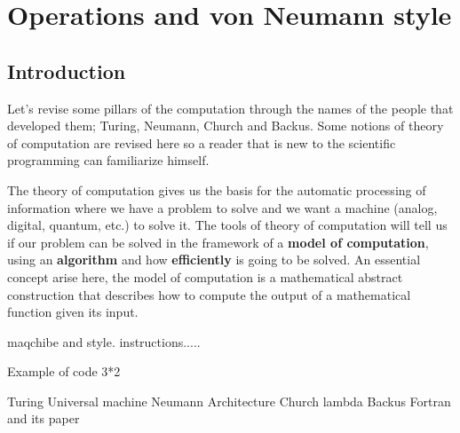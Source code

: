 \chapter{Operations and von Neumann style} 

\section{Introduction}

Let's revise some pillars of the computation through the names of the people that developed them; Turing, Neumann, Church and Backus. Some notions of theory of computation are revised here so a reader that is new to the scientific programming can familiarize himself. 

The theory of computation gives us the basis for the automatic processing of information where we have a problem to solve and we want a machine (analog, digital, quantum, etc.) to solve it. The tools of theory of computation will tell us if our problem can be solved in the framework of a \textbf{model of computation}, using an \textbf{algorithm} and how \textbf{efficiently} is going to be solved. An essential concept arise here, the model of computation is a mathematical abstract construction that describes how to compute the output of a mathematical function given its input. 





maqchibe and style. instructions.....

Example of code 3*2 

Turing Universal machine 
Neumann Architecture 
Church lambda 
Backus Fortran and its paper 
















\newpage 
